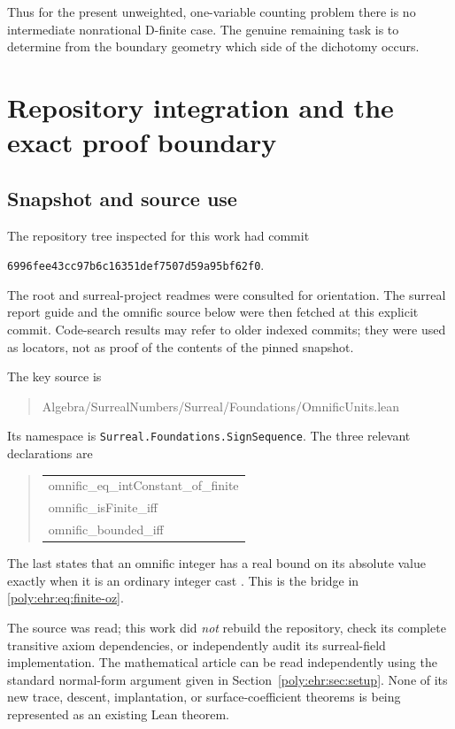 \documentclass[11pt,a4paper]{article}
\numberwithin{equation}{section}
\theoremstyle{plain}
\begin{document}
Thus for the present unweighted, one-variable counting problem there is
no intermediate nonrational D-finite case. The genuine remaining task is
to determine from the boundary geometry which side of the dichotomy occurs.

\section{Repository integration and the exact proof boundary}\label{poly:ehr:sec:repo}

\subsection{Snapshot and source use}

The repository tree inspected for this work had commit
\begin{center}
\texttt{6996fee43cc97b6c16351def7507d59a95bf62f0}.
\end{center}
The root and surreal-project readmes were consulted for orientation. The
surreal report guide and the omnific source below were then fetched at
this explicit commit. Code-search results may refer to older indexed
commits; they were used as locators, not as proof of the contents of the
pinned snapshot.

The key source is
\begin{quote}\small\ttfamily
Algebra/SurrealNumbers/Surreal/Foundations/\allowbreak OmnificUnits.lean
\end{quote}
Its namespace is \texttt{Surreal.Foundations.SignSequence}.
The three relevant declarations are
\begin{quote}\small\ttfamily
\begin{tabular}{l}
omnific\_eq\_intConstant\_of\_finite\\
omnific\_isFinite\_iff\\
omnific\_bounded\_iff
\end{tabular}
\end{quote}
The last states that an omnific integer has a real bound on its absolute
value exactly when it is an ordinary integer cast \cite{ehr:repo-units}.
This is the bridge in \eqref{poly:ehr:eq:finite-oz}.

The source was read; this work did \emph{not} rebuild the repository,
check its complete transitive axiom dependencies, or independently audit
its surreal-field implementation. The mathematical article can be read
independently using the standard normal-form argument given in
Section~\ref{poly:ehr:sec:setup}. None of its new trace, descent, implantation,
or surface-coefficient theorems is being represented as an existing
Lean theorem.
\end{document}
